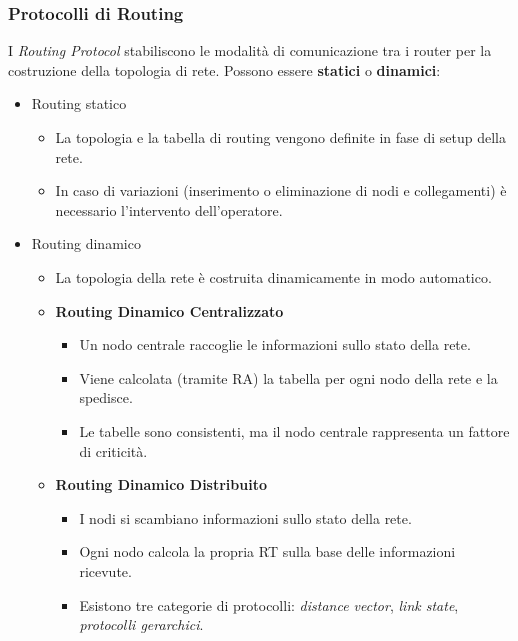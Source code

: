 \begin{center}
            \end{center}

        \subsubsection{Protocolli di Routing}
            I \textit{Routing Protocol} stabiliscono le modalità di comunicazione tra i router per la costruzione della topologia di rete. Possono essere \textbf{statici} o \textbf{dinamici}:
            \begin{itemize}
                \item Routing statico
                \begin{itemize}
                    \item La topologia e la tabella di routing vengono definite in fase di setup
                    della rete.
                    \item In caso di variazioni (inserimento o eliminazione di nodi e collegamenti) è necessario l'intervento dell'operatore.
                \end{itemize}
                \item Routing dinamico
                \begin{itemize}
                    \item La topologia della rete è costruita dinamicamente in modo automatico.
                    \item \textbf{Routing Dinamico Centralizzato}
                    \begin{itemize}
                        \item Un nodo centrale raccoglie le informazioni sullo stato della rete.
                        \item Viene calcolata (tramite RA) la tabella per ogni nodo della rete
                        e la spedisce.
                        \item Le tabelle sono consistenti, ma il nodo centrale rappresenta un
                        fattore di criticità.
                    \end{itemize}
                    \item \textbf{Routing Dinamico Distribuito}
                    \begin{itemize}
                        \item I nodi si scambiano informazioni sullo stato della rete.
                        \item Ogni nodo calcola la propria RT sulla base delle informazioni ricevute.
                        \item Esistono tre categorie di protocolli: \textit{distance vector}, \textit{link state}, \textit{protocolli gerarchici}.
                    \end{itemize}
                \end{itemize}
            \end{itemize}

